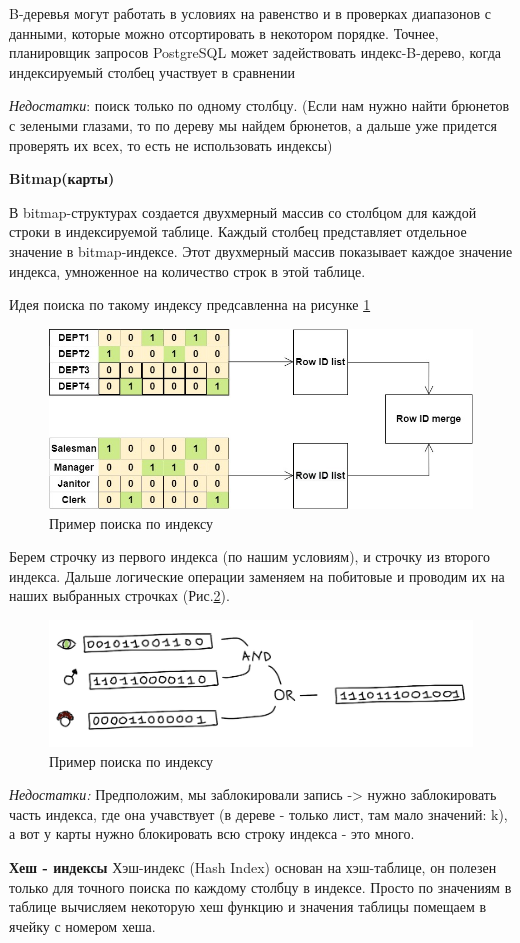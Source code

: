 B-деревья могут работать в условиях на равенство и в проверках диапазонов с данными, которые можно отсортировать в некотором порядке. Точнее, планировщик запросов PostgreSQL может задействовать индекс-B-дерево, когда индексируемый столбец участвует в сравнении 

\textit{Недостатки}: поиск только по одному столбцу. (Если нам нужно найти брюнетов с зелеными глазами, то по дереву мы найдем брюнетов, а дальше уже придется проверять их всех, то есть не использовать индексы)

\textbf{Bitmap(карты)} 

В bitmap-структурах создается двухмерный массив со столбцом для каждой строки в индексируемой таблице. Каждый столбец представляет отдельное значение в bitmap-индексе. Этот двухмерный массив показывает каждое значение индекса, умноженное на количество строк в этой таблице.

Идея поиска по такому индексу предсавленна на рисунке \ref{fig:Map}  

\begin{figure}[!h]
    \centering
    \includegraphics[scale = 0.5]{4/Index.jpg}
    \caption{Пример поиска по индексу}
    \label{fig:Map}
\end{figure}


Берем строчку из первого индекса (по нашим условиям), и строчку из второго индекса. Дальше логические операции заменяем на побитовые и проводим их на наших выбранных строчках (Рис.\ref{fig:BMap}).

\begin{figure}[!h]
    \centering
    \includegraphics[scale = 0.4]{4/BitMat.png}
    \caption{Пример поиска по индексу}
    \label{fig:BMap}
\end{figure}

\textit{Недостатки:} Предположим, мы заблокировали запись -> нужно заблокировать часть индекса, где она учавствует (в дереве - только лист, там мало значений: k), а вот у карты нужно блокировать всю строку индекса - это много.


\textbf{Хеш - индексы} 
Хэш-индекс (Hash Index) основан на хэш-таблице, он полезен только для точного поиска по каждому столбцу в индексе. Просто по значениям в таблице вычисляем некоторую хеш функцию и значения таблицы помещаем в ячейку с номером хеша. 

